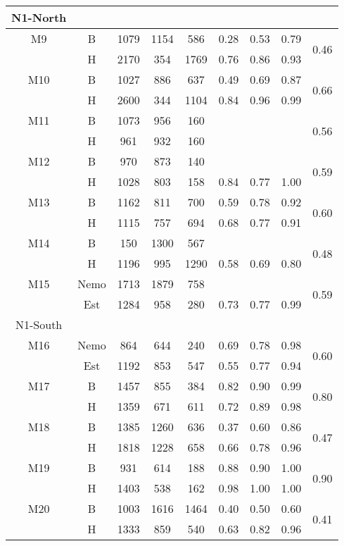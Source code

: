 \begin{longtable}{c c c c c c c c c}
  \midrule
  N1-North\\
  \midrule
  M9  & B & 1079 & 1154 & 586 & 0.28 & 0.53 & 0.79 & \multirow{2}{*}{0.46}\\
      & H & 2170 & 354 & 1769 & 0.76 & 0.86 & 0.93 & \\
  M10 & B & 1027 & 886 & 637 & 0.49 & 0.69 & 0.87 & \multirow{2}{*}{0.66}\\
      & H & 2600 & 344 & 1104 & 0.84 & 0.96 & 0.99 & \\
  M11 & B & 1073 & 956 & 160 &  &  &  & \multirow{2}{*}{0.56}\\
      & H & 961 & 932 & 160 &  &  &  & \\
  M12 & B & 970 & 873 & 140 &  &  &  & \multirow{2}{*}{0.59}\\
      & H & 1028 & 803 & 158 & 0.84 & 0.77 & 1.00 & \\
  M13 & B & 1162 & 811 & 700 & 0.59 & 0.78 & 0.92 & \multirow{2}{*}{0.60}\\
      & H & 1115 & 757 & 694 & 0.68 & 0.77 & 0.91 & \\
  M14 & B & 150 & 1300 & 567 &  &  &  & \multirow{2}{*}{0.48}\\
      & H & 1196 & 995 & 1290 & 0.58 & 0.69 & 0.80 & \\
  M15 & Nemo & 1713 & 1879 & 758 &  &  &  & \multirow{2}{*}{0.59}\\
      & Est & 1284 & 958 & 280 & 0.73 & 0.77 & 0.99 & \\
  \midrule
  N1-South\\
  \midrule
  M16 & Nemo & 864 & 644 & 240 & 0.69 & 0.78 & 0.98 & \multirow{2}{*}{0.60} \\
      & Est & 1192 & 853 & 547 & 0.55 & 0.77 & 0.94 & \\
  M17 & B & 1457 & 855 & 384 & 0.82 & 0.90 & 0.99 & \multirow{2}{*}{0.80} \\
      & H & 1359 & 671 & 611 & 0.72 & 0.89 & 0.98 & \\
  M18 & B & 1385 & 1260 & 636 & 0.37 & 0.60 & 0.86 & \multirow{2}{*}{0.47} \\
      & H & 1818 & 1228 & 658 & 0.66 & 0.78 & 0.96 & \\
  M19 & B & 931 & 614 & 188 & 0.88 & 0.90 & 1.00 & \multirow{2}{*}{0.90} \\
      & H & 1403 & 538 & 162 & 0.98 & 1.00 & 1.00 & \\
  M20 & B & 1003 & 1616 & 1464 & 0.40 & 0.50 & 0.60 & \multirow{2}{*}{0.41} \\
      & H & 1333 & 859 & 540 & 0.63 & 0.82 & 0.96 & \\

\end{longtable}
